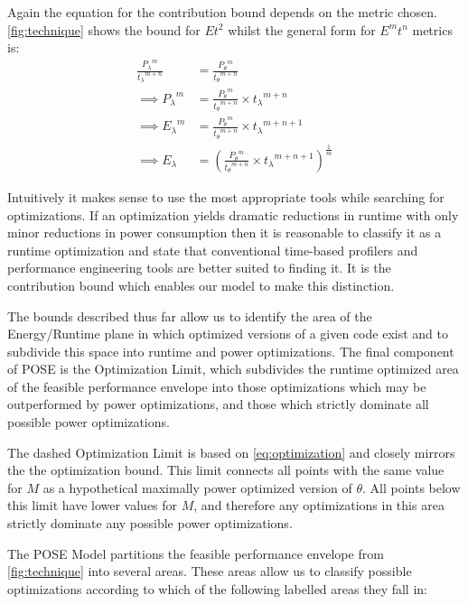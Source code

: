 Again the equation for the contribution bound depends on the metric chosen. 
\autoref{fig:technique} shows the bound for $Et^2$ whilst the general form for $E^mt^n$ metrics is:
\begin{align}
\frac{{P_{\lambda}}^m}{{t_{\lambda}}^{m+n}} &= \frac{{P_{\theta}}^m}{{t_{\theta}}^{m+n}} \nonumber \\
\implies {P_{\lambda}}^m &= \frac{{P_{\theta}}^m}{{t_{\theta}}^{m+n}} \times {t_\lambda}^{m+n} \nonumber \\ 
\implies {E_{\lambda}}^m &= \frac{{P_{\theta}}^m}{{t_{\theta}}^{m+n}} \times {t_\lambda}^{m+n+1} \nonumber \\ 
\implies E_{\lambda} &= (\frac{{P_{\theta}}^m}{{t_{\theta}}^{m+n}} \times {t_\lambda}^{m+n+1})^{\frac{1}{m}} 
\end{align}

Intuitively it makes sense to use the most appropriate tools while searching for optimizations.  If an optimization yields dramatic reductions in runtime with only minor reductions in power consumption then it is reasonable to classify it as a runtime optimization and state that conventional time-based profilers and performance engineering tools are better suited to finding it. It is the contribution bound which enables our model to make this distinction.

The bounds described thus far allow us to identify the area of the Energy/Runtime plane in which optimized versions of a given code exist and to subdivide this space into runtime and power optimizations. The final component of POSE is the Optimization Limit, which subdivides the runtime optimized area of the feasible performance envelope into those optimizations which may be outperformed by power optimizations, and those which strictly dominate all possible power optimizations.

The dashed Optimization Limit is based on \autoref{eq:optimization} and closely mirrors the the optimization bound.
This limit connects all points with the same value for $M$ as a hypothetical maximally power optimized version of $\theta$. 
All points below this limit have lower values for $M$, and therefore any optimizations in this area strictly dominate any possible power optimizations. 

The POSE Model partitions the feasible performance envelope from \autoref{fig:technique} into several areas.
These areas allow us to classify possible optimizations according to which of the following labelled areas they fall in:

